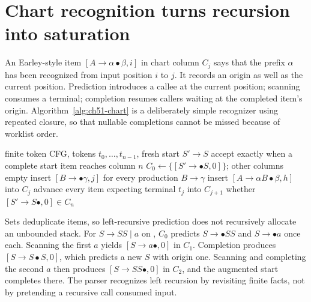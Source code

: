 \section{Chart recognition turns recursion into saturation}
\label{sec:ch51-chart}

An Earley-style item $[A\to\alpha\mathbin{\bullet}\beta,i]$ in chart column $C_j$ says that the prefix $\alpha$ has been recognized from input position $i$ to $j$.
It records an origin as well as the current position.
Prediction introduces a callee at the current position; scanning consumes a terminal; completion resumes callers waiting at the completed item's origin.
Algorithm~\ref{alg:ch51-chart} is a deliberately simple recognizer using repeated closure, so that nullable completions cannot be missed because of worklist order.

\begin{algorithm}[htbp]
\caption{Recognize a token CFG by chart saturation, including nullable completions.}
\label{alg:ch51-chart}
\begin{pseudocode}
\Require finite token CFG, tokens $t_0,\ldots,t_{n-1}$, fresh start $S'\to S$
\Ensure accept exactly when a complete start item reaches column $n$
\State $C_0\gets\{[S'\to\bullet S,0]\}$; other columns empty
  \Repeat
      \State insert $[B\to\bullet\gamma,j]$ for every production $B\to\gamma$
    \EndFor
        \State insert $[A\to\alpha B\bullet\beta,h]$ into $C_j$
      \EndFor
    \EndFor
    \State advance every item expecting terminal $t_j$ into $C_{j+1}$
  \EndIf
\EndFor
\State \Return whether $[S'\to S\bullet,0]\in C_n$
\end{pseudocode}
\end{algorithm}

Sets deduplicate items, so left-recursive prediction does not recursively allocate an unbounded stack.
For $S\to SS\mid a$ on , $C_0$ predicts $S\to\bullet SS$ and $S\to\bullet a$ once each.
Scanning the first $a$ yields $[S\to a\bullet,0]$ in $C_1$.
Completion produces $[S\to S\bullet S,0]$, which predicts a new $S$ with origin one.
Scanning and completing the second $a$ then produces $[S\to SS\bullet,0]$ in $C_2$, and the augmented start completes there.
The parser recognizes left recursion by revisiting finite facts, not by pretending a recursive call consumed input.

